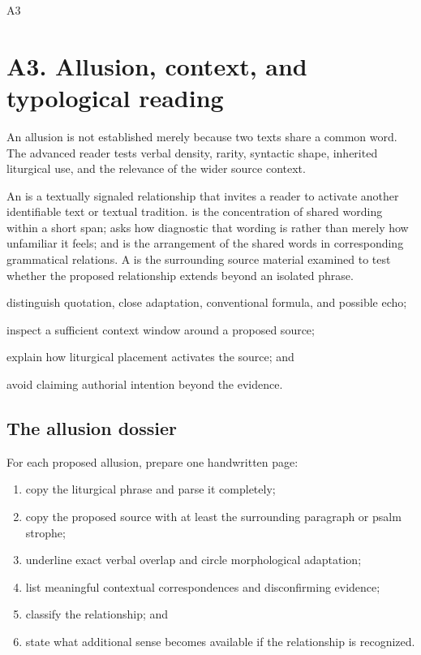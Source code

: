\begin{courseunit}{A3}
\chapter{A3. Allusion, context, and typological reading}

An allusion is not established merely because two texts share a common word.
The advanced reader tests verbal density, rarity, syntactic shape, inherited
liturgical use, and the relevance of the wider source context.

An  is a textually signaled relationship that invites a reader
to activate another identifiable text or textual tradition.  is the concentration of shared wording within a short span;
 asks how diagnostic that wording is rather than merely how
unfamiliar it feels; and  is the arrangement of the
shared words in corresponding grammatical relations. A 
is the surrounding source material examined to test whether the proposed
relationship extends beyond an isolated phrase.

\begin{learningobjectives}
  \item distinguish quotation, close adaptation, conventional formula, and
        possible echo;
  \item inspect a sufficient context window around a proposed source;
  \item explain how liturgical placement activates the source; and
  \item avoid claiming authorial intention beyond the evidence.
\end{learningobjectives}

\section{The allusion dossier}

For each proposed allusion, prepare one handwritten page:

\begin{enumerate}
  \item copy the liturgical phrase and parse it completely;
  \item copy the proposed source with at least the surrounding paragraph or
        psalm strophe;
  \item underline exact verbal overlap and circle morphological adaptation;
  \item list meaningful contextual correspondences and disconfirming evidence;
  \item classify the relationship; and
  \item state what additional sense becomes available if the relationship is
        recognized.
\end{enumerate}


\end{courseunit}
